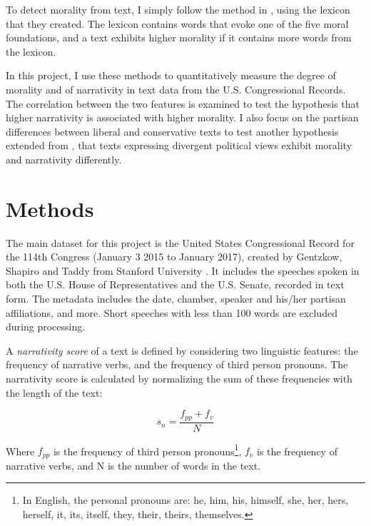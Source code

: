 \documentclass[a4paper]{article}
\begin{document}
To detect morality from text, I simply follow the method in \cite{graham2009liberals}, using the lexicon that they created. The lexicon contains words that evoke one of the five moral foundations, and a text exhibits higher morality if it contains more words from the lexicon.

In this project, I use these methods to quantitatively measure the degree of morality and of narrativity in text data from the U.S. Congressional Records. The correlation between the two features is examined to test the hypothesis that higher narrativity is associated with higher morality. I also focus on the partisan differences between liberal and conservative texts to test another hypothesis extended from \cite{graham2009liberals}, that texts expressing divergent political views exhibit morality and narrativity differently.





\section*{Methods}
The main dataset for this project is the United States Congressional Record for the 114th Congress (January 3 2015 to January 2017), created by Gentzkow, Shapiro and Taddy from Stanford University \cite{114congress}. It includes the speeches spoken in both the U.S. House of Representatives and the U.S. Senate, recorded in text form. The metadata includes the date, chamber, speaker and his/her partisan affiliations, and more. Short speeches with less than 100 words are excluded during processing.

A \emph{narrativity score} of a text is defined by considering two linguistic features: the frequency of narrative verbs, and the frequency of third person pronouns. The narrativity score is calculated by normalizing the sum of these frequencies with the length of the text:

\begin{equation}
s_n = \frac{f_{pp} + f_v}{N}
\end{equation}

Where $f_{pp}$ is the frequency of third person pronouns\footnote{In English, the personal pronouns are: he, him, his, himself, she, her, hers, herself, it, its, itself, they, their, theirs, themselves.}, $f_v$ is the frequency of narrative verbs, and N is the number of words in the text. 
\end{document}
